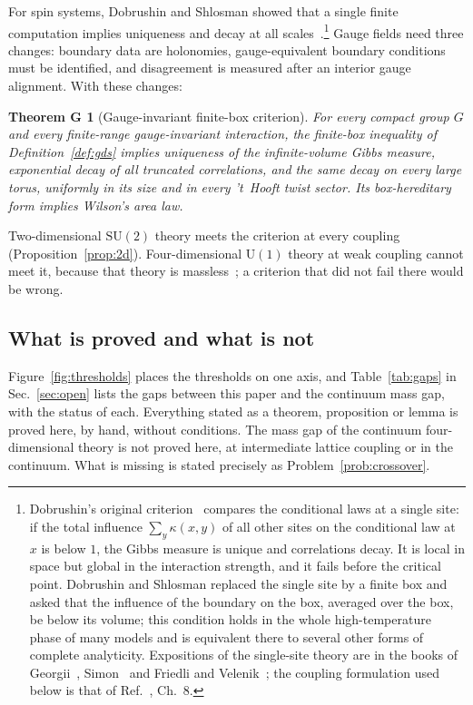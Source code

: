 \documentclass[aps,prd,twocolumn,superscriptaddress,nofootinbib,longbibliography,floatfix,amsmath,amssymb,10pt]{revtex4-2}
\newtheorem*{theoremG}{Theorem G}
\theoremstyle{definition}
\theoremstyle{remark}
\newcommand{\SU}{\mathrm{SU}}
\newcommand{\U}{\mathrm{U}}
\begin{document}
For spin systems, Dobrushin and Shlosman showed that a single finite
computation implies uniqueness and decay at all scales~\cite{DS85}.\footnote{Dobrushin's
original criterion~\cite{Dob68,Dob70} compares the conditional laws at a
single site: if the total influence $\sum_y\kappa(x,y)$ of all other sites on
the conditional law at $x$ is below $1$, the Gibbs measure is unique and
correlations decay. It is local in space but global in the interaction
strength, and it fails before the critical point. Dobrushin and Shlosman
replaced the single site by a finite box and asked that the influence of the
boundary on the box, averaged over the box, be below its volume; this
condition holds in the whole high-temperature phase of many models and is
equivalent there to several other forms of complete analyticity. Expositions
of the single-site theory are in the books of Georgii~\cite{Geo11},
Simon~\cite{Sim93} and Friedli and Velenik~\cite{FV17}; the coupling
formulation used below is that of Ref.~\cite{Geo11}, Ch.~8.} Gauge
fields need three changes: boundary data are holonomies,
gauge-equivalent boundary conditions must be identified, and disagreement
is measured after an interior gauge alignment. With these changes:

\begin{theoremG}[Gauge-invariant finite-box criterion]
For every compact group $G$ and every finite-range gauge-invariant
interaction, the finite-box inequality of Definition~\ref{def:gds} implies
uniqueness of the infinite-volume Gibbs measure, exponential decay of all
truncated correlations, and the same decay on every large torus, uniformly
in its size and in every 't~Hooft twist sector. Its box-hereditary form
implies Wilson's area law.
\end{theoremG}

Two-dimensional $\SU(2)$ theory meets the criterion at every coupling
(Proposition~\ref{prop:2d}). Four-dimensional $\U(1)$ theory at weak coupling
cannot meet it, because that theory is massless~\cite{Gut80,FS82}; a
criterion that did not fail there would be wrong.

\subsection{What is proved and what is not}

Figure~\ref{fig:thresholds} places the thresholds on one axis, and
Table~\ref{tab:gaps} in Sec.~\ref{sec:open} lists the gaps between this paper
and the continuum mass gap, with the status of each. Everything stated as a
theorem, proposition or lemma is proved here, by hand, without conditions.
The mass gap of the continuum four-dimensional theory is not proved here, at
intermediate lattice coupling or in the continuum. What is missing is stated
precisely as Problem~\ref{prob:crossover}.
\end{document}
